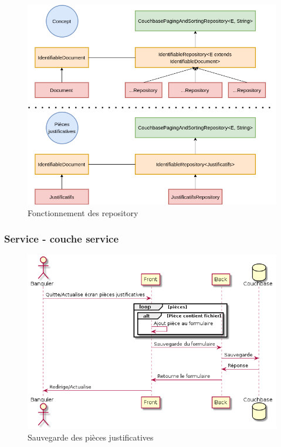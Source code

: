 \begin{figure}[h!]
	\includegraphics[scale=0.55]{images/travailBP1818/piecesJustif/repository.png}
	\centering
	\caption{Fonctionnement des repository}
	\label{repository}
\end{figure}
	
	\subsubsection{Service - couche service}

\begin{figure}[h!]
	\includegraphics[scale=0.55]{images/travailBP1818/piecesJustif/seqSave.png}
	\centering
	\caption{Sauvegarde des pièces justificatives}
	\label{seqSave}
\end{figure}

